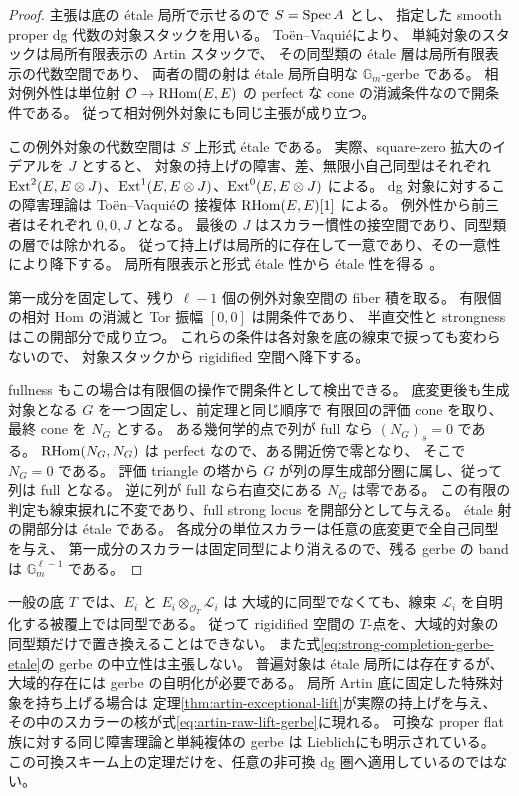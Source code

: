 \begin{proof}
主張は底の \'etale 局所で示せるので $S=\operatorname{Spec} A$ とし、
指定した smooth proper dg 代数の対象スタックを用いる。
To\"en--Vaqui\'e\cite[Corollaries 3.15, 3.21, 3.22]{ToenVaquie}により、
単純対象のスタックは局所有限表示の Artin スタックで、
その同型類の \'etale 層は局所有限表示の代数空間であり、
両者の間の射は \'etale 局所自明な $\mathbb G_m$-gerbe である。
相対例外性は単位射
$\mathcal O\to\operatorname{RHom}(E,E)$ の perfect な cone の消滅条件なので開条件である。
従って相対例外対象にも同じ主張が成り立つ。

この例外対象の代数空間は $S$ 上形式 \'etale である。
実際、square-zero 拡大のイデアルを $J$ とすると、
対象の持上げの障害、差、無限小自己同型はそれぞれ
$\operatorname{Ext}^2(E,E\otimes J)$、$\operatorname{Ext}^1(E,E\otimes J)$、$\operatorname{Ext}^0(E,E\otimes J)$ による。
dg 対象に対するこの障害理論は
To\"en--Vaqui\'e\cite[Corollary 3.17 とその直前]{ToenVaquie}の
接複体 $\operatorname{RHom}(E,E)[1]$ による。
例外性から前三者はそれぞれ $0,0,J$ となる。
最後の $J$ はスカラー慣性の接空間であり、同型類の層では除かれる。
従って持上げは局所的に存在して一意であり、その一意性により降下する。
局所有限表示と形式 \'etale 性から \'etale 性を得る
\cite[Tag 0616]{Stacks}。

第一成分を固定して、残り $\ell-1$ 個の例外対象空間の fiber 積を取る。
有限個の相対 Hom の消滅と Tor 振幅 $[0,0]$ は開条件であり、
半直交性と strongness はこの開部分で成り立つ。
これらの条件は各対象を底の線束で捩っても変わらないので、
対象スタックから rigidified 空間へ降下する。

fullness もこの場合は有限個の操作で開条件として検出できる。
底変更後も生成対象となる $G$ を一つ固定し、前定理と同じ順序で
有限回の評価 cone を取り、最終 cone を $N_G$ とする。
ある幾何学的点で列が full なら $(N_G)_s=0$ である。
$\operatorname{RHom}(N_G,N_G)$ は perfect なので、ある開近傍で零となり、
そこで $N_G=0$ である。
評価 triangle の塔から $G$ が列の厚生成部分圏に属し、従って列は full となる。
逆に列が full なら右直交にある $N_G$ は零である。
この有限の判定も線束捩れに不変であり、full strong locus を開部分として与える。
\'etale 射の開部分は \'etale である。
各成分の単位スカラーは任意の底変更で全自己同型を与え、
第一成分のスカラーは固定同型により消えるので、残る gerbe の band は
$\mathbb G_m^{\ell-1}$ である。
\end{proof}

\begin{remark}
\label{rem:relative-scalar-gerbe}
一般の底 $T$ では、$E_i$ と $E_i\otimes_{\mathcal O_T}\mathcal L_i$ は
大域的に同型でなくても、線束 $\mathcal L_i$ を自明化する被覆上では同型である。
従って rigidified 空間の $T$-点を、大域的対象の同型類だけで置き換えることはできない。
また式\eqref{eq:strong-completion-gerbe-etale}の gerbe の中立性は主張しない。
普遍対象は \'etale 局所には存在するが、大域的存在には gerbe の自明化が必要である。
局所 Artin 底に固定した特殊対象を持ち上げる場合は
定理\ref{thm:artin-exceptional-lift}が実際の持上げを与え、
その中のスカラーの核が式\eqref{eq:artin-raw-lift-gerbe}に現れる。
可換な proper flat 族に対する同じ障害理論と単純複体の gerbe は
Lieblich\cite[Theorem 3.1.1, Corollary 4.3.3]{LieblichComplexes}にも明示されている。
この可換スキーム上の定理だけを、任意の非可換 dg 圏へ適用しているのではない。
\end{remark}


